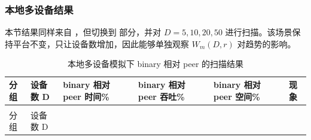 \subsubsection{本地多设备结果}\label{ux672cux5730ux591aux8bbeux5907ux7ed3ux679c}

本节结果同样来自 ，但切换到  部分，并对 \(D=5,10,20,50\) 进行扫描。该场景保持平台不变，只让设备数增加，因此能够单独观察 \(W_m(D,r)\) 对趋势的影响。

\begin{longtable}[]{@{}
  >{\centering\arraybackslash}p{}
  >{\centering\arraybackslash}p{}
  >{\centering\arraybackslash}p{}
  >{\centering\arraybackslash}p{}
  >{\centering\arraybackslash}p{}
  >{\raggedright\arraybackslash}p{}@{}}
\caption{本地多设备模拟下 binary 相对 peer 的扫描结果}\label{tbl:multi-vs-peer}\tabularnewline
\toprule\noalign{}
\begin{minipage}[t]{\hsize}\centering
分组
\end{minipage} & \begin{minipage}[t]{\hsize}\centering
设备数 D
\end{minipage} & \begin{minipage}[t]{\hsize}\centering
binary 相对 peer 时间\%
\end{minipage} & \begin{minipage}[t]{\hsize}\centering
binary 相对 peer 吞吐\%
\end{minipage} & \begin{minipage}[t]{\hsize}\centering
binary 相对 peer 空间\%
\end{minipage} & \begin{minipage}[t]{\hsize}\centering
现象
\end{minipage} \\
\midrule\noalign{}
\endfirsthead
\multicolumn{6}{r}{（续表\thetable）} \\
\toprule\noalign{}
\begin{minipage}[t]{\hsize}\centering
分组
\end{minipage} & \begin{minipage}[t]{\hsize}\centering
设备数 D
\end{minipage} & \begin{minipage}[t]{\hsize}\centering

\end{minipage}
\end{longtable}
